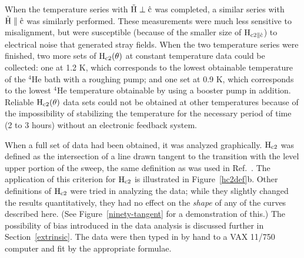 	When the temperature series with  $\rm  \vec{H} \perp \hat{c}$  was
completed,  a   similar series with  $\rm  \vec{H}  \parallel  \hat{c}$ was
similarly performed.  These   measurements were  much  less  sensitive   to
misalignment, but were susceptible  (because of the   smaller size of  $\rm
H_{c2\parallel \hat{c}}$) to electrical noise that  generated stray fields.
When the  two  temperature series were  finished, two   more  sets  of $\rm
H_{c2}(\theta)$ at constant temperature data could be collected: one at 1.2
K,  which  corresponds to  the lowest obtainable temperature  of the $^4$He
bath with a roughing pump; and  one set at  0.9 K, which corresponds to the
lowest $^4$He temperature  obtainable by using a booster  pump in addition.
Reliable $\rm  H_{c2}(\theta)$ data  sets could  not be  obtained  at other
temperatures  because  of the impossibility  of stabilizing the temperature
for  the necessary period of  time  (2 to 3   hours) without an  electronic
feedback system.

	When  a  full set of   data had  been   obtained,  it was  analyzed
graphically.  $\rm H_{c2}$ was defined as the  intersection of a line drawn
tangent to the transition with  the level upper  portion of the  sweep, the
same definition as was used in Ref.~\cite{iye82}.  The  application of this
criterion for $\rm H_{c2}$  is illustrated in  Figure~\ref{hc2def}b.  Other
definitions of  $\rm H_{c2}$ were tried in  analyzing the  data; while they
slightly changed the results quantitatively, they had no effect on the {\em
shape} of any of the curves described here.  (See Figure~\ref{ninety-tangent}
for  a demonstration of  this.)  The  possibility of bias introduced in the
data analysis is discussed  further in  Section~\ref{extrinsic}.  The  data
were then typed in  by  hand  to a  VAX 11/750  computer   and  fit by  the
appropriate formulae. 

